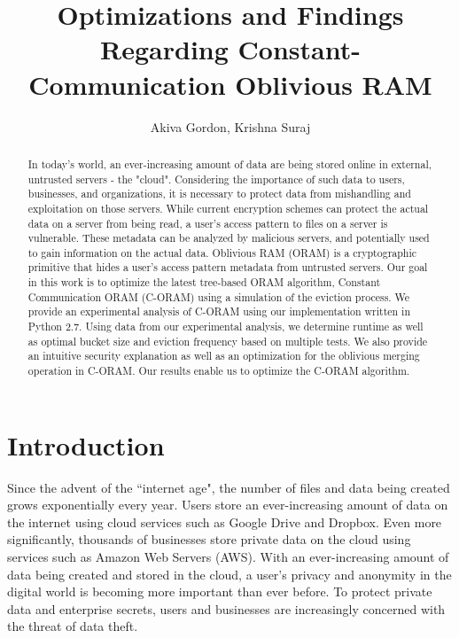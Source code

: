 \documentclass[12pt, oneside]{article}   	%
\title{Optimizations and Findings Regarding Constant-Communication Oblivious RAM}
\author{Akiva Gordon, Krishna Suraj}
\date{}							%
\begin{document}
\maketitle

\begin{abstract}
In today's world, an ever-increasing amount of data are being stored online in external, untrusted servers - the "cloud". Considering the importance of such data to users, businesses, and organizations, it is necessary to protect data from mishandling and exploitation on those servers. While current encryption schemes can protect the actual data on a server from being read, a user's access pattern to files on a server is vulnerable. These metadata can be analyzed by malicious servers, and potentially used to gain information on the actual data. Oblivious RAM (ORAM) is a cryptographic primitive that hides a user's access pattern metadata from untrusted servers. Our goal in this work is to optimize the latest tree-based ORAM algorithm, Constant Communication ORAM (C-ORAM) using a simulation of the eviction process. We provide an experimental analysis of C-ORAM using our implementation written in Python 2.7. Using data from our experimental analysis, we determine runtime as well as optimal bucket size and eviction frequency based on multiple tests. We also provide an intuitive security explanation as well as an optimization for the oblivious merging operation in C-ORAM. Our results enable us to optimize the C-ORAM algorithm. 

\end{abstract}


\section{Introduction}
Since the advent of the ``internet age", the number of files and data being created grows exponentially every year. Users store an ever-increasing amount of data on the internet using cloud services such as Google Drive and Dropbox. Even more significantly, thousands of businesses store private data on the cloud using services such as Amazon Web Servers (AWS). With an ever-increasing amount of data being created and stored in the cloud, a user's privacy and anonymity in the digital world is becoming more important than ever before. To protect private data and enterprise secrets, users and businesses are increasingly concerned with the threat of data theft.
\end{document}
